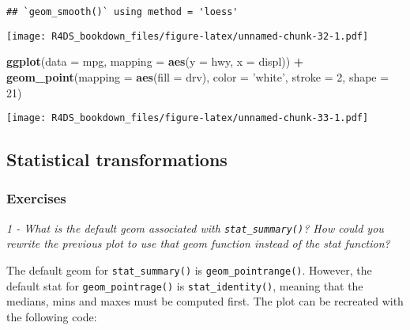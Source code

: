 \documentclass[]{article}
\newenvironment{Shaded}{\begin{snugshade}}{\end{snugshade}}
\newcommand{\KeywordTok}[1]{\textcolor[rgb]{0.13,0.29,0.53}{\textbf{#1}}}
\newcommand{\DataTypeTok}[1]{\textcolor[rgb]{0.13,0.29,0.53}{#1}}
\newcommand{\DecValTok}[1]{\textcolor[rgb]{0.00,0.00,0.81}{#1}}
\newcommand{\StringTok}[1]{\textcolor[rgb]{0.31,0.60,0.02}{#1}}
\newcommand{\OperatorTok}[1]{\textcolor[rgb]{0.81,0.36,0.00}{\textbf{#1}}}
\newcommand{\NormalTok}[1]{#1}
\theoremstyle{definition}
\theoremstyle{definition}
\theoremstyle{definition}
\theoremstyle{remark}
\begin{document}
\begin{verbatim}
## `geom_smooth()` using method = 'loess'
\end{verbatim}

\texttt{[image: R4DS\_bookdown\_files/figure-latex/unnamed-chunk-32-1.pdf]}

\begin{Shaded}
\begin{Highlighting}[]
\KeywordTok{ggplot}\NormalTok{(}\DataTypeTok{data =}\NormalTok{ mpg, }\DataTypeTok{mapping =} \KeywordTok{aes}\NormalTok{(}\DataTypeTok{y =}\NormalTok{ hwy, }\DataTypeTok{x =}\NormalTok{ displ)) }\OperatorTok{+}\StringTok{ }
\StringTok{  }\KeywordTok{geom_point}\NormalTok{(}\DataTypeTok{mapping =} \KeywordTok{aes}\NormalTok{(}\DataTypeTok{fill =}\NormalTok{ drv), }\DataTypeTok{color =} \StringTok{'white'}\NormalTok{, }\DataTypeTok{stroke =} \DecValTok{2}\NormalTok{, }\DataTypeTok{shape =} \DecValTok{21}\NormalTok{)}
\end{Highlighting}
\end{Shaded}

\texttt{[image: R4DS\_bookdown\_files/figure-latex/unnamed-chunk-33-1.pdf]}

\subsection{Statistical
transformations}\label{statistical-transformations}

\subsubsection{Exercises}\label{exercises-4}

\emph{1 - What is the default geom associated with
\texttt{stat\_summary()}? How could you rewrite the previous plot to use
that geom function instead of the stat function?}

The default geom for \texttt{stat\_summary()} is
\texttt{geom\_pointrange()}. However, the default stat for
\texttt{geom\_pointrage()} is \texttt{stat\_identity()}, meaning that
the medians, mins and maxes must be computed first. The plot can be
recreated with the following code:
\end{document}
